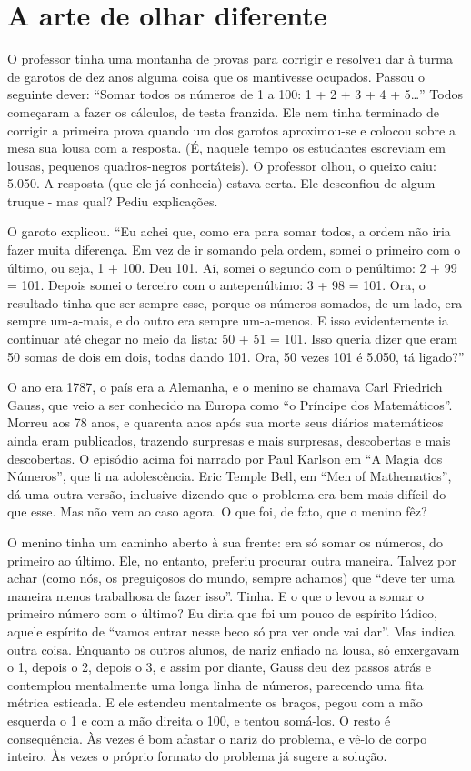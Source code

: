 \chapter{A arte de olhar diferente}

O professor tinha uma montanha de provas para corrigir e resolveu dar
à turma de garotos de dez anos alguma coisa que os mantivesse
ocupados. Passou o seguinte dever: “Somar todos os números de 1 a
100: 1 + 2 + 3 + 4 + 5…” Todos começaram a fazer os cálculos, de
testa franzida. Ele nem tinha terminado de corrigir a primeira prova
quando um dos garotos aproximou-se e colocou sobre a mesa sua lousa
com a resposta. (É, naquele tempo os estudantes escreviam em lousas,
pequenos quadros-negros portáteis). O professor olhou, o queixo caiu:
5.050. A resposta (que ele já conhecia) estava certa. Ele desconfiou
de algum truque - mas qual? Pediu explicações.

O garoto explicou. “Eu achei que, como era para somar todos, a ordem
não iria fazer muita diferença. Em vez de ir somando pela ordem,
somei o primeiro com o último, ou seja, 1 + 100. Deu 101. Aí, somei o
segundo com o penúltimo: 2 + 99 = 101. Depois somei o terceiro com o
antepenúltimo: 3 + 98 = 101. Ora, o resultado tinha que ser sempre
esse, porque os números somados, de um lado, era sempre um-a-mais, e
do outro era sempre um-a-menos. E isso evidentemente ia continuar até
chegar no meio da lista: 50 + 51 = 101. Isso queria dizer que eram 50
somas de dois em dois, todas dando 101. Ora, 50 vezes 101 é 5.050, tá
ligado?”

O ano era 1787, o país era a Alemanha, e o menino se chamava Carl
Friedrich Gauss, que veio a ser conhecido na Europa como “o Príncipe
dos Matemáticos”. Morreu aos 78 anos, e quarenta anos após sua morte
seus diários matemáticos ainda eram publicados, trazendo surpresas e
mais surpresas, descobertas e mais descobertas. O episódio acima foi
narrado por Paul Karlson em “A Magia dos Números”, que li na
adolescência. Eric Temple Bell, em “Men of Mathematics”, dá uma outra
versão, inclusive dizendo que o problema era bem mais difícil do que
esse. Mas não vem ao caso agora. O que foi, de fato, que o menino
fêz?

O menino tinha um caminho aberto à sua frente: era só somar os
números, do primeiro ao último. Ele, no entanto, preferiu procurar
outra maneira. Talvez por achar (como nós, os preguiçosos do mundo,
sempre achamos) que “deve ter uma maneira menos trabalhosa de fazer
isso”. Tinha. E o que o levou a somar o primeiro número com o último?
Eu diria que foi um pouco de espírito lúdico, aquele espírito de
“vamos entrar nesse beco só pra ver onde vai dar”. Mas indica outra
coisa. Enquanto os outros alunos, de nariz enfiado na lousa, só
enxergavam o 1, depois o 2, depois o 3, e assim por diante, Gauss deu
dez passos atrás e contemplou mentalmente uma longa linha de números,
parecendo uma fita métrica esticada. E ele estendeu mentalmente os
braços, pegou com a mão esquerda o 1 e com a mão direita o 100, e
tentou somá-los. O resto é consequência. Às vezes é bom afastar o
nariz do problema, e vê-lo de corpo inteiro. Às vezes o próprio
formato do problema já sugere a solução.

